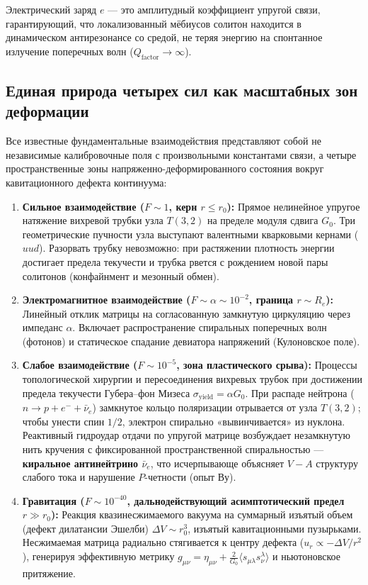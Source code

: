 \documentclass[11pt,a4paper]{article}
\theoremstyle{definition}
\theoremstyle{remark}
\begin{document}
Электрический заряд $e$ — это амплитудный коэффициент упругой связи, гарантирующий, что локализованный мёбиусов солитон находится в динамическом антирезонансе со средой, не теряя энергию на спонтанное излучение поперечных волн ($Q_{\mathrm{factor}} \to \infty$).

\subsection{Единая природа четырех сил как масштабных зон деформации}
Все известные фундаментальные взаимодействия представляют собой не независимые калибровочные поля с произвольными константами связи, а четыре пространственные зоны напряженно-деформированного состояния вокруг кавитационного дефекта континуума:

\begin{enumerate}
    \item \textbf{Сильное взаимодействие ($F \sim 1$, керн $r \le r_0$):} Прямое нелинейное упругое натяжение вихревой трубки узла $T(3,2)$ на пределе модуля сдвига $G_0$. Три геометрические пучности узла выступают валентными кварковыми кернами ($uud$). Разорвать трубку невозможно: при растяжении плотность энергии достигает предела текучести и трубка рвется с рождением новой пары солитонов (конфайнмент и мезонный обмен).
    
    \item \textbf{Электромагнитное взаимодействие ($F \sim \alpha \sim 10^{-2}$, граница $r \sim R_e$):} Линейный отклик матрицы на согласованную замкнутую циркуляцию через импеданс $\alpha$. Включает распространение спиральных поперечных волн (фотонов) и статическое спадание девиатора напряжений (Кулоновское поле).
    
    \item \textbf{Слабое взаимодействие ($F \sim 10^{-5}$, зона пластического срыва):} Процессы топологической хирургии и пересоединения вихревых трубок при достижении предела текучести Губера--фон Мизеса $\sigma_{\mathrm{yield}} = \alpha G_0$. При распаде нейтрона ($n \to p + e^- + \bar{\nu}_e$) замкнутое кольцо поляризации отрывается от узла $T(3,2)$; чтобы унести спин $1/2$, электрон спирально «вывинчивается» из нуклона. Реактивный гидроудар отдачи по упругой матрице возбуждает незамкнутую нить кручения с фиксированной пространственной спиральностью — \textbf{киральное антинейтрино $\bar{\nu}_e$}, что исчерпывающе объясняет $V-A$ структуру слабого тока и нарушение $P$-четности (опыт Ву).
    
    \item \textbf{Гравитация ($F \sim 10^{-40}$, дальнодействующий асимптотический предел $r \gg r_0$):} Реакция квазинесжимаемого вакуума на суммарный изъятый объем (дефект дилатансии Эшелби) $\Delta V \sim r_0^3$, изъятый кавитационными пузырьками. Несжимаемая матрица радиально стягивается к центру дефекта ($u_r \propto -\Delta V / r^2$), генерируя эффективную метрику $g_{\mu\nu} = \eta_{\mu\nu} + \frac{2}{G_0}\langle s_{\mu\lambda}s^\lambda_\nu\rangle$ и ньютоновское притяжение.
\end{enumerate}
\end{document}
